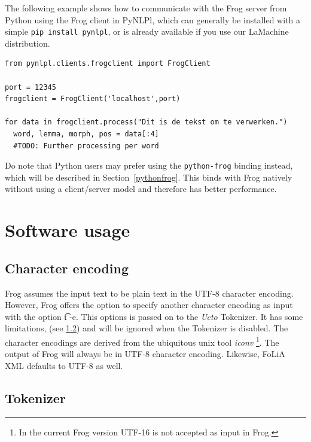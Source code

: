 \documentclass{book}
\begin{document}
The following example shows how to communicate with the Frog server from Python
using the Frog client in PyNLPl, which can generally be installed with a simple
\texttt{pip install pynlpl}, or is already available if you use our LaMachine distribution.

\begin{verbatim}
from pynlpl.clients.frogclient import FrogClient

port = 12345
frogclient = FrogClient('localhost',port)

for data in frogclient.process("Dit is de tekst om te verwerken.")
  word, lemma, morph, pos = data[:4]
  #TODO: Further processing per word
\end{verbatim}

Do note that Python users may prefer using the \texttt{python-frog} binding
instead, which will be described in Section~\ref{pythonfrog}. This binds with Frog natively
without using a client/server model and therefore has better performance.


\section{Software usage}
\label{sec-usage}


\subsection{Character encoding}

Frog assumes the input text to be plain text in the UTF-8 character
encoding. However, Frog offers the option to specify another character encoding
as input with the option {\t t -e}. This options is passed on to the {\it Ucto} Tokenizer. It has some limitations, (see \ref{tokenizer}) and will be ignored when the Tokenizer is disabled. The character encodings are derived from
the ubiquitous unix tool {\it iconv } \footnote{In the current Frog version
UTF-16 is not accepted as input in Frog.}. The output of Frog will always be in
UTF-8 character encoding. Likewise, FoLiA XML defaults to UTF-8 as well.



\subsection{Tokenizer}
\label{tokenizer}
\end{document}
